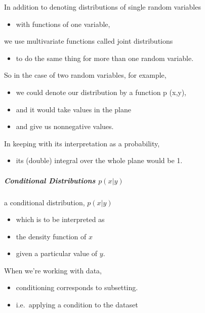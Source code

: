 \documentclass[]{article}
\providecommand{\tightlist}{%
  \setlength{\itemsep}{0pt}\setlength{\parskip}{0pt}}
\let\oldsubparagraph\subparagraph
\renewcommand{\subparagraph}[1]{\oldsubparagraph{#1}\mbox{}}
\begin{document}
In addition to denoting distributions of single random variables

\begin{itemize}
\tightlist
\item
  with functions of one variable,
\end{itemize}

we use multivariate functions called joint distributions

\begin{itemize}
\tightlist
\item
  to do the same thing for more than one random variable.
\end{itemize}

So in the case of two random variables, for example,

\begin{itemize}
\tightlist
\item
  we could denote our distribution by a function p (x,y),
\item
  and it would take values in the plane
\item
  and give us nonnegative values.
\end{itemize}

In keeping with its interpretation as a probability,

\begin{itemize}
\tightlist
\item
  its (double) integral over the whole plane would be 1.
\end{itemize}

\subparagraph{\texorpdfstring{Conditional Distributions
\(p(x|y)\)}{Conditional Distributions p(x\textbar{}y)}}\label{conditional-distributions-pxy}

a conditional distribution, \(p(x|y)\)

\begin{itemize}
\tightlist
\item
  which is to be interpreted as
\item
  the density function of \(x\)
\item
  given a particular value of \(y\).
\end{itemize}

When we're working with data,

\begin{itemize}
\tightlist
\item
  conditioning corresponds to subsetting.
\item
  i.e.~applying a condition to the dataset
\end{itemize}
\end{document}

